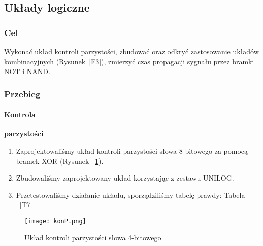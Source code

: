 \documentclass[12pt]{mwart}
\begin{document}
\subsection{Układy logiczne}
\subsubsection{Cel}
Wykonać układ kontroli parzystości, zbudować oraz odkryć zastosowanie układów kombinacyjnych (Rysunek~\ref{F3}), zmierzyć czas propagacji sygnału przez bramki NOT i NAND.

\subsubsection{Przebieg}
\paragraph{Kontrola}\textbf{parzystości}\\
\begin{enumerate}
	\item Zaprojektowaliśmy układ kontroli parzystości słowa 8-bitowego za pomocą bramek XOR (Rysunek ~\ref{F6}).
	\item Zbudowaliśmy zaprojektowany układ korzystając z zestawu UNILOG.
	\item Przetestowaliśmy działanie układu, sporządziliśmy tabelę prawdy: Tabela ~\ref{T7}
\end{enumerate}
\begin{figure}[hbt!]
  \texttt{[image: konP.png]}
  \caption{Układ kontroli parzystości słowa 4-bitowego}
  \label{F6}
\end{figure}
\end{document}
